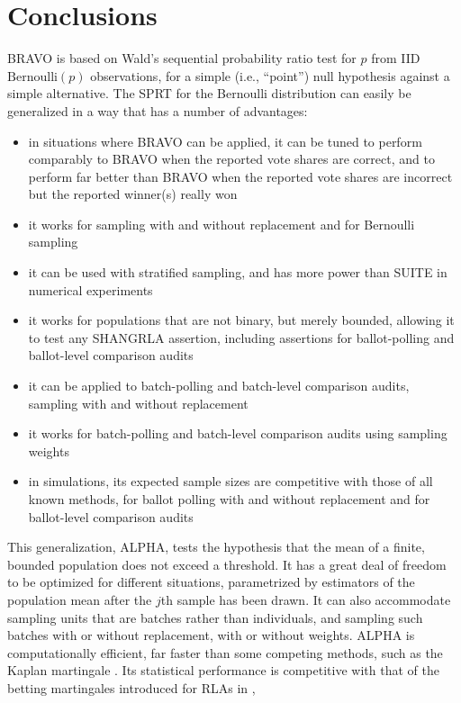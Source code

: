\documentclass[aoas]{imsart}
\newcommand{\Bern}{\ensuremath{\mathrm{Bernoulli}}}
\begin{document}
\section{Conclusions}
BRAVO is based on Wald's sequential probability ratio test for $p$ from IID $\Bern(p)$ observations, for a simple (i.e., ``point'') null hypothesis against a simple alternative.
The SPRT for the Bernoulli distribution can easily be generalized in a way that has a number of advantages:
\begin{itemize}
   \item in situations where BRAVO can be applied, it can be tuned to perform comparably to BRAVO when the reported vote shares are correct, 
             and to perform far better than BRAVO when the reported vote shares are incorrect but the reported winner(s) really won
   \item it works for sampling with and without replacement and for Bernoulli sampling
   \item it can be used with stratified sampling, and has more power than SUITE \citep{ottoboniEtal18} in numerical experiments \citep{spertusStark22}
   \item it works for populations that are not binary, but merely bounded, allowing it to test any SHANGRLA assertion,
            including assertions for ballot-polling and ballot-level comparison audits
   \item it can be applied to batch-polling and batch-level comparison audits, sampling with and without replacement
   \item it works for batch-polling and batch-level comparison audits using sampling weights
   \item in simulations, its expected sample sizes are competitive with those of all known methods, for ballot polling with and without replacement and 
            for ballot-level comparison audits
   \end{itemize}
This generalization, ALPHA, tests the hypothesis that the mean of a finite, bounded population does not exceed a threshold.
It has a great deal of freedom to be optimized for different situations, parametrized by
estimators of the population mean after the $j$th sample has been drawn.
It can also accommodate sampling units that are batches rather than individuals, and sampling such batches
with or without replacement, with or without weights.
ALPHA is computationally efficient, far faster than some competing methods, such as the Kaplan martingale \citep{starkEvans19,stark20}.
Its statistical performance is competitive with that of the betting martingales introduced for RLAs in \citet{waudby-smithEtal21},
\end{document}
